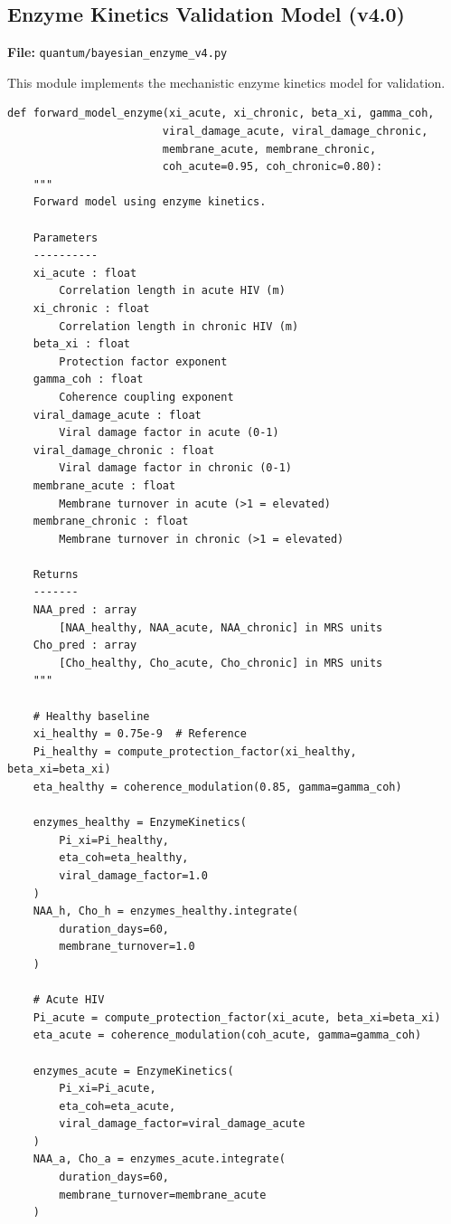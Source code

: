 \documentclass[11pt]{article}
\begin{document}
\subsection{Enzyme Kinetics Validation Model (v4.0)}

\textbf{File:} \texttt{quantum/bayesian\_enzyme\_v4.py}

This module implements the mechanistic enzyme kinetics model for validation.

\begin{lstlisting}[caption={Enzyme Kinetics Model - Forward Model (Lines 77--166)}]
def forward_model_enzyme(xi_acute, xi_chronic, beta_xi, gamma_coh,
                        viral_damage_acute, viral_damage_chronic,
                        membrane_acute, membrane_chronic,
                        coh_acute=0.95, coh_chronic=0.80):
    """
    Forward model using enzyme kinetics.

    Parameters
    ----------
    xi_acute : float
        Correlation length in acute HIV (m)
    xi_chronic : float
        Correlation length in chronic HIV (m)
    beta_xi : float
        Protection factor exponent
    gamma_coh : float
        Coherence coupling exponent
    viral_damage_acute : float
        Viral damage factor in acute (0-1)
    viral_damage_chronic : float
        Viral damage factor in chronic (0-1)
    membrane_acute : float
        Membrane turnover in acute (>1 = elevated)
    membrane_chronic : float
        Membrane turnover in chronic (>1 = elevated)

    Returns
    -------
    NAA_pred : array
        [NAA_healthy, NAA_acute, NAA_chronic] in MRS units
    Cho_pred : array
        [Cho_healthy, Cho_acute, Cho_chronic] in MRS units
    """

    # Healthy baseline
    xi_healthy = 0.75e-9  # Reference
    Pi_healthy = compute_protection_factor(xi_healthy, beta_xi=beta_xi)
    eta_healthy = coherence_modulation(0.85, gamma=gamma_coh)

    enzymes_healthy = EnzymeKinetics(
        Pi_xi=Pi_healthy,
        eta_coh=eta_healthy,
        viral_damage_factor=1.0
    )
    NAA_h, Cho_h = enzymes_healthy.integrate(
        duration_days=60,
        membrane_turnover=1.0
    )

    # Acute HIV
    Pi_acute = compute_protection_factor(xi_acute, beta_xi=beta_xi)
    eta_acute = coherence_modulation(coh_acute, gamma=gamma_coh)

    enzymes_acute = EnzymeKinetics(
        Pi_xi=Pi_acute,
        eta_coh=eta_acute,
        viral_damage_factor=viral_damage_acute
    )
    NAA_a, Cho_a = enzymes_acute.integrate(
        duration_days=60,
        membrane_turnover=membrane_acute
    )


\end{lstlisting}
\end{document}
